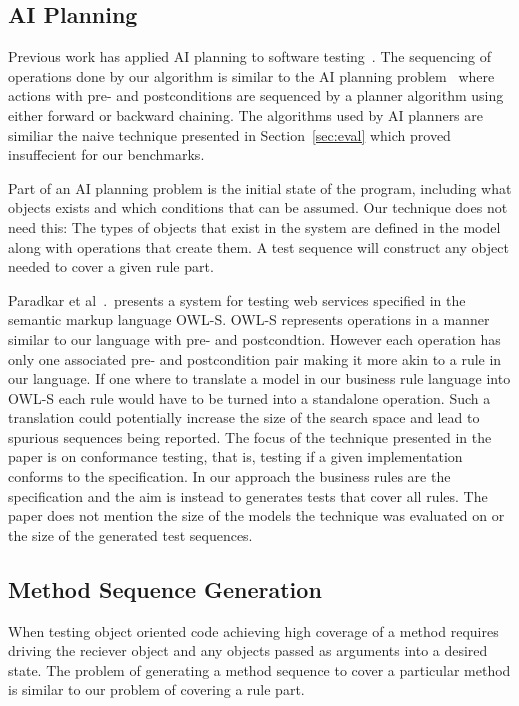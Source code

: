 \subsection{AI Planning}

Previous work has applied AI planning to software
testing~\cite{Scheetz99ai,Howe97testcase}. The sequencing of
operations done by our algorithm is similar to the AI planning
problem~\cite{Weld94} where actions with pre- and postconditions are sequenced
by a planner algorithm using either forward or backward chaining. The
algorithms used by AI planners are similiar the naive technique
presented in Section~\ref{sec:eval} which proved insuffecient for our
benchmarks. 

Part of an AI planning problem is the initial state of the program,
including what objects exists and which conditions that can be
assumed. Our technique does not need this: The types of objects that
exist in the system are defined in the model along with operations
that create them. A test sequence will construct any object needed to
cover a given rule part.

Paradkar et al~\cite{conf/icws/ParadkarSWJOSL07}.\ presents a system
for testing web services specified in the semantic markup language
OWL-S. OWL-S represents operations in a manner similar to our language
with pre- and postcondtion. However each operation has only one
associated pre- and postcondition pair making it more akin to a rule
in our language. If one where to translate a model in our business
rule language into OWL-S each rule would have to be turned into a
standalone operation. Such a translation could potentially increase the
size of the search space and lead to spurious sequences being
reported. The focus of the technique presented in the paper is on
conformance testing, that is, testing if a given implementation
conforms to the specification. In our approach the business rules are
the specification and the aim is instead to generates tests that cover
all rules. The paper does not mention the size of the models the
technique was evaluated on or the size of the generated test
sequences.

\subsection{Method Sequence Generation}

When testing object oriented code achieving high coverage of a method
requires driving the reciever object and any objects passed as
arguments into a desired state. The problem of generating a method
sequence to cover a particular method is similar to our problem of
covering a rule part. 


